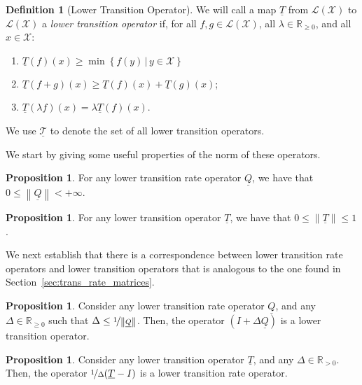 \documentclass[10pt]{paper}
\theoremstyle{definition}
\newtheorem{proposition}[theorem]{Proposition}
\newtheorem{definition}{Definition}
\newcommand{\reals}{\mathbb{R}}
\newcommand{\realspos}{\reals_{>0}}
\newcommand{\realsnonneg}{\reals_{\geq 0}}
\newcommand{\states}{\mathcal{X}}
\newcommand{\lt}{\underline{T}}
\newcommand{\gambles}{\mathcal{L}}
\newcommand{\gamblesX}{\gambles(\states)}
\newcommand{\lrate}{\underline{Q}}
\newcommand{\norm}[1]{\left\lVert #1 \right\rVert}
\begin{document}
\begin{definition}[Lower Transition Operator]\label{def:coh_low_trans}
We will call a map $\lt$ from $\gamblesX$ to $\gamblesX$ a \emph{lower transition operator} if, for all $f,g\in\gamblesX$, all $\lambda\in\realsnonneg$, and all $x\in\states$:

\begin{enumerate}[label=C\arabic*:]
\item
$\lt(f)(x)\geq\min\left\{f(y)\,\vert\,y\in\states\right\}$
\item
$\lt(f+g)(x)\geq\lt(f)(x)+\lt(g)(x)$;
\item
$\lt(\lambda f)(x)=\lambda\lt(f)(x)$.
\end{enumerate}
\noindent We use $\underline{\mathcal{T}}$ to denote the set of all lower transition operators.
\vspace{5pt}
\end{definition}

\noindent We start by giving some useful properties of the norm of these operators.

\begin{proposition}\label{lem:normlratefinite}
For any lower transition rate operator $\lrate$, we have that $0\leq\norm{\lrate}<+\infty$.
\end{proposition}

\begin{proposition}\label{lemma:normofcoherenttrans}
For any lower transition operator $\lt$, we have that $0\leq \norm{\lt}\leq 1$.
\end{proposition}

We next establish that there is a correspondence between lower transition rate operators and lower transition operators that is analogous to the one found in Section~\ref{sec:trans_rate_matrices}.

\begin{proposition}\label{lemma:normQsmallenough}
Consider any lower transition rate operator $\lrate$, and any $\Delta\in\realsnonneg$ such that $\Delta\leq\nicefrac{1}{\norm{\lrate}}$. Then, the operator $(I+\Delta\lrate)$ is a lower transition operator.
\end{proposition}

\begin{proposition}\label{lemma:lower_trans_to_lower_rate}
Consider any lower transition operator $\lt$, and any $\Delta\in\realspos$. Then, the operator $\nicefrac{1}{\Delta}(\lt - I)$ is a lower transition rate operator.
\end{proposition}
\end{document}
